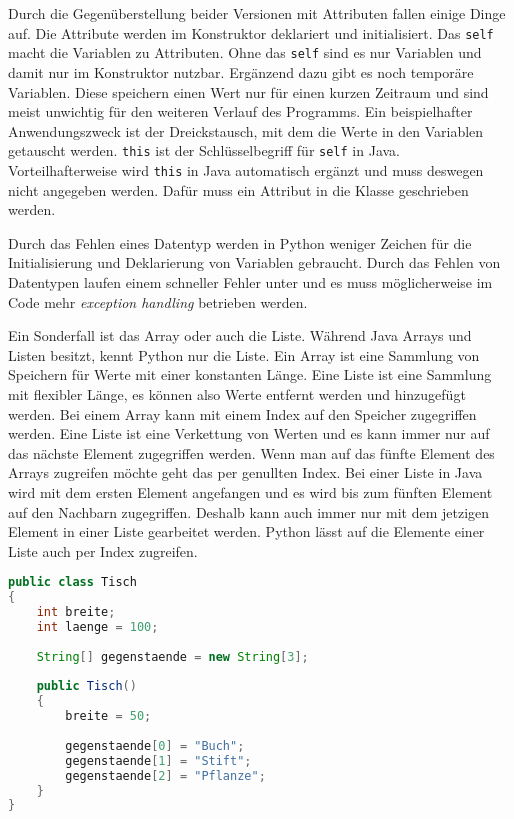 Durch die Gegenüberstellung beider Versionen mit Attributen fallen einige Dinge auf. Die Attribute werden im Konstruktor deklariert und initialisiert. Das \texttt{self} macht die Variablen zu Attributen. Ohne das \texttt{self} sind es nur Variablen und damit nur im Konstruktor nutzbar. Ergänzend dazu gibt es noch temporäre Variablen. Diese speichern einen Wert nur für einen kurzen Zeitraum und sind meist unwichtig für den weiteren Verlauf des Programms. Ein beispielhafter Anwendungszweck ist der Dreickstausch, mit dem die Werte in den Variablen getauscht werden. \texttt{this} ist der Schlüsselbegriff für \texttt{self} in Java. Vorteilhafterweise wird \texttt{this} in Java automatisch ergänzt und muss deswegen nicht angegeben werden. Dafür muss ein Attribut in die Klasse geschrieben werden. 
\par
Durch das Fehlen eines Datentyp werden in Python weniger Zeichen für die Initialisierung und Deklarierung von Variablen gebraucht. Durch das Fehlen von Datentypen laufen einem schneller Fehler unter und es muss möglicherweise im Code mehr \textit{exception handling} betrieben werden.
\par
Ein Sonderfall ist das Array oder auch die Liste. Während Java Arrays und Listen besitzt, kennt Python nur die Liste. Ein Array ist eine Sammlung von Speichern für Werte mit einer konstanten Länge. Eine Liste ist eine Sammlung mit flexibler Länge, es können also Werte entfernt werden und hinzugefügt werden. Bei einem Array kann mit einem Index auf den Speicher zugegriffen werden. Eine Liste ist eine Verkettung von Werten und es kann immer nur auf das nächste Element zugegriffen werden. Wenn man auf das fünfte Element des Arrays zugreifen möchte geht das per genullten Index. Bei einer Liste in Java wird mit dem ersten Element angefangen und es wird bis zum fünften Element auf den Nachbarn zugegriffen. Deshalb kann auch immer nur mit dem jetzigen Element in einer Liste gearbeitet werden. Python lässt auf die Elemente einer Liste auch per Index zugreifen. \cite{Louis:2010}\cite{Python3:Buch}

\begin{lstlisting}[language=java,caption={Array in Java},captionpos=b,label={lst:java:array},frame=none]
public class Tisch
{
    int breite;
    int laenge = 100;
  
    String[] gegenstaende = new String[3];
  
    public Tisch()
    {
        breite = 50;
    
        gegenstaende[0] = "Buch";
        gegenstaende[1] = "Stift";
        gegenstaende[2] = "Pflanze";
    }
}
\end{lstlisting}

